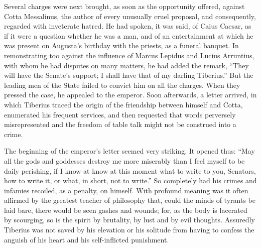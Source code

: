 
Several charges were next brought, as soon as the opportunity offered, against Cotta Messalinus, the author of every unusually cruel proposal, and consequently, regarded with inveterate hatred. He had spoken, it was said, of Caius Caesar, as if it were a question whether he was a man, and of an entertainment at which he was present on Augusta's birthday with the priests, as a funeral banquet. In remonstrating too against the influence of Marcus Lepidus and Lucius Arruntius, with whom he had disputes on many matters, he had added the remark, ``They will have the Senate's support; I shall have that of my darling Tiberius.'' But the leading men of the State failed to convict him on all the charges. When they pressed the case, he appealed to the emperor. Soon afterwards, a letter arrived, in which Tiberius traced the origin of the friendship between himself and Cotta, enumerated his frequent services, and then requested that words perversely misrepresented and the freedom of table talk might not be construed into a crime.


The beginning of the emperor's letter seemed very striking. It opened thus: ``May all the gods and goddesses destroy me more miserably than I feel myself to be daily perishing, if I know at know at this moment what to write to you, Senators, how to write it, or what, in short, not to write.'' So completely had his crimes and infamies recoiled, as a penalty, on himself. With profound meaning was it often affirmed by the greatest teacher of philosophy that, could the minds of tyrants be laid bare, there would be seen gashes and wounds; for, as the body is lacerated by scourging, so is the spirit by brutality, by lust and by evil thoughts. Assuredly Tiberius was not saved by his elevation or his solitude from having to confess the anguish of his heart and his self-inflicted punishment.


